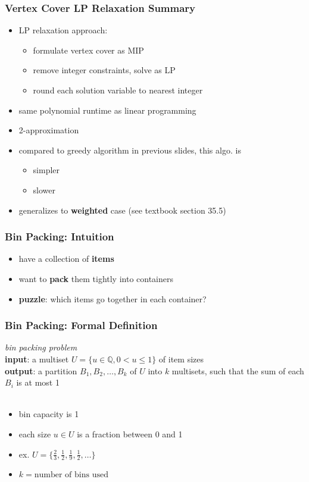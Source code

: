\documentclass[10pt,aspectratio=169]{beamer}
\newcommand{\stanza}{ \\~\ }
\begin{document}
\begin{frame} \frametitle{Vertex Cover LP Relaxation Summary}
\begin{itemize}
  \item LP relaxation approach:
    \begin{itemize}
      \item formulate vertex cover as MIP
      \item remove integer constraints, solve as LP
      \item round each solution variable to nearest integer
    \end{itemize}
  \item same polynomial runtime as linear programming
  \item 2-approximation
  \item compared to greedy algorithm in previous slides, this algo. is
  \begin{itemize}
    \item simpler
    \item slower
  \end{itemize}
  \item generalizes to \textbf{weighted} case (see textbook section 35.5)
\end{itemize}
\end{frame}

\begin{frame} \frametitle{Bin Packing: Intuition}
  \begin{itemize}
    \item have a collection of \textbf{items}
    \item want to \textbf{pack} them tightly into containers
    \item \textbf{puzzle}: which items go together in each container?
  \end{itemize}
\end{frame}

\begin{frame} \frametitle{Bin Packing: Formal Definition}
  \emph{bin packing problem} \\
  \textbf{input}: a multiset $U = \{u \in \mathbb{Q}, 0 < u\leq 1\}$ of item sizes \\
  \textbf{output}: a partition $B_1, B_2, \ldots, B_k$ of $U$ into $k$ multisets, such that the sum of each $B_i$ is at most 1
  \stanza

  \begin{itemize}
    \item bin capacity is 1
    \item each size $u \in U$ is a fraction between 0 and 1
    \item ex. $U=\{\frac{2}{3}, \frac{1}{2}, \frac{1}{9}, \frac{1}{2}, \ldots \}$
    \item $k = \text{number of bins used}$
  \end{itemize}
\end{frame}
\end{document}

